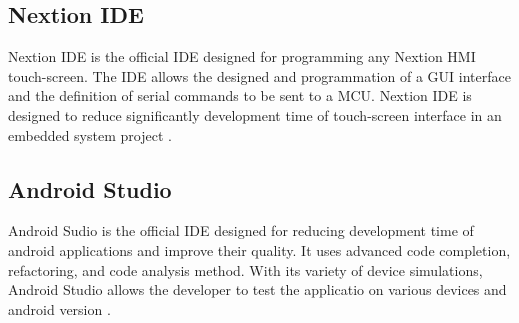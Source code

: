 \subsection{Nextion IDE}
Nextion IDE is the official IDE designed for programming any Nextion HMI touch-screen. The IDE allows the designed and programmation of a GUI interface and the definition of serial commands to be sent to a MCU. Nextion IDE is designed to reduce significantly development time of touch-screen interface in an embedded system project \cite{nextion}.

\subsection{Android Studio}
Android Sudio is the official IDE designed for reducing development time of android applications and improve their quality. It uses advanced code completion, refactoring, and code analysis method. With its variety of device simulations, Android Studio allows the developer to test the applicatio on various devices and android version \cite{android}.

